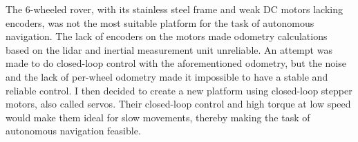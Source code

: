 \documentclass[11pt]{article}
\begin{document}

            The 6-wheeled rover, with its stainless steel frame and weak DC motors lacking encoders, was not the most suitable platform for the task of autonomous navigation. The lack of encoders on the motors made odometry calculations based on the lidar and inertial measurement unit unreliable. An attempt was made to do closed-loop control with the aforementioned odometry, but the noise and the lack of per-wheel odometry made it impossible to have a stable and reliable control. I then decided to create a new platform using closed-loop stepper motors, also called servos. Their closed-loop control and high torque at low speed would make them ideal for slow movements, thereby making the task of autonomous navigation feasible.


            \begin{figure}[H]
                \centering 
            \end{figure}
\end{document}
